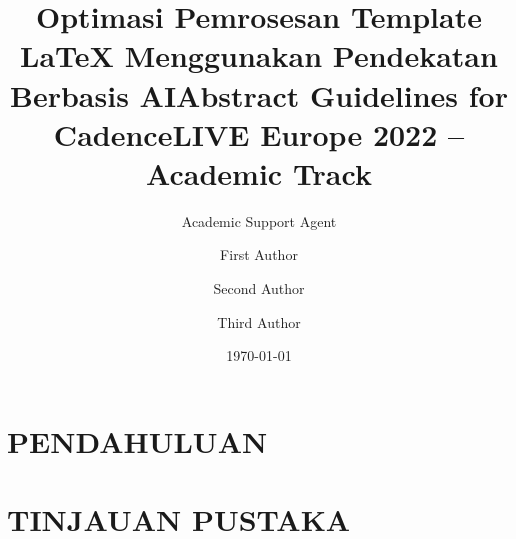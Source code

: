 \documentclass{article}
\title{Optimasi Pemrosesan Template LaTeX Menggunakan Pendekatan Berbasis AI}
\author{Academic Support Agent}
\date{\today}
\begin{document}
\maketitle

\begin{abstract}

\end{abstract}

\chapter{PENDAHULUAN}


\chapter{TINJAUAN PUSTAKA}





\title {Abstract Guidelines for CadenceLIVE Europe 2022 -- Academic Track}

\author[*]{First Author}
\author[**]{Second Author}
\author[***]{Third Author}
\newcommand{\email}{corresponding author's e-mail address}
\end{document}
